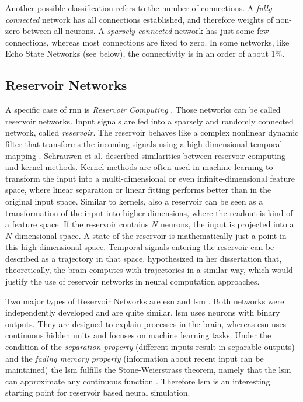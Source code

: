 Another possible classification refers to the number of connections. A \emph{fully connected} network has all connections established, and therefore weights of non-zero between all neurons. A \emph{sparsely connected} network has just some few connections, whereas most connections are fixed to zero. In some networks, like Echo State Networks (see below), the connectivity is in an order of about $1\%$.

\subsection{Reservoir Networks}
\label{sec:res-net}

A specific case of \acs{rnn} is \emph{Reservoir Computing} \parencite{lukovsevivcius2009reservoir}. Those networks can be called reservoir networks. Input signals are fed into a sparsely and randomly connected network, called \emph{reservoir}. The reservoir behaves like a complex nonlinear dynamic filter that transforms the incoming signals using a high-dimensional temporal mapping \parencite{schrauwen2007overview}. Schrauwen et al. described similarities between reservoir computing and kernel methods. Kernel methods are often used in machine learning to transform the input into a multi-dimensional or even infinite-dimensional feature space, where linear separation or linear fitting performs better than in the original input space. Similar to kernels, also a reservoir can be seen as a transformation of the input into higher dimensions, where the readout is kind of a feature space. If the reservoir contains $N$ neurons, the input is projected into a $N$-dimensional space. A state of the reservoir is mathematically just a point in this high dimensional space. Temporal signals entering the reservoir can be described as a trajectory in that space. \textcite{lazarphd2009self} hypothesized in her dissertation that, theoretically, the brain computes with trajectories in a similar way, which would justify the use of reservoir networks in neural computation approaches.

Two major types of Reservoir Networks are \ac{esn} \parencite{jaeger2004harnessing} and \ac{lsm} \parencite{maass2002real}. Both networks were independently developed \parencite{goodfellow2007deep} and are quite similar. \ac{lsm} uses neurons with binary outputs. They are designed to explain processes in the brain, whereas \ac{esn} uses continuous hidden units and focuses on machine learning tasks. Under the condition of the \emph{separation property} (different inputs result in separable outputs) and the \emph{fading memory property} (information about recent input can be maintained) the \ac{lsm} fulfills the Stone-Weierstrass theorem, namely that the \ac{lsm} can approximate any continuous function \parencite{maass2004computational}. Therefore \ac{lsm} is an interesting starting point for reservoir based neural simulation.

